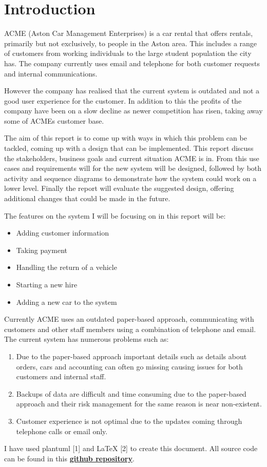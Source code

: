 \section{Introduction}
ACME (Aston Car Management Enterprises) is a car rental that offers rentals, primarily but not exclusively, to people in the Aston area.
This includes a range of customers from working individuals to the large student population the city has. The company currently uses email and telephone
for both customer requests and internal communications. 

However the company has realised that the current system is outdated and not a good user experience for the customer. In addition to this the 
profits of the company have been on a slow decline as newer competition has risen, taking away some of ACMEs customer base. 

The aim of this report is to come up with ways in which this problem can be tackled, coming up with a design that can be implemented. This report
discuss the stakeholders, business goals and current situation ACME is in. From this use cases and requirements will for the new system will be designed,
followed by both activity and sequence diagrams to demonstrate how the system could work on a lower level. Finally the report will evaluate the suggested
design, offering additional changes that could be made in the future.

The features on the system I will be focusing on in this report will be:
\begin{itemize}
  \item Adding customer information
  \item Taking payment
  \item Handling the return of a vehicle
  \item Starting a new hire
  \item Adding a new car to the system
\end{itemize}

Currently ACME uses an outdated paper-based approach, communicating with customers and other staff members using a combination of telephone and email.
The current system has numerous problems such as: 
\begin{enumerate}
  \item Due to the paper-based approach important details such as details about orders, cars and accounting can often go missing causing issues 
  for both customers and internal staff.
  \item Backups of data are difficult and time consuming due to the paper-based approach and their risk management for the same reason is near non-existent.
  \item Customer experience is not optimal due to the updates coming through telephone calls or email only.
\end{enumerate}

\vspace{0.2cm}

I have used plantuml [1] and LaTeX [2] to create this document. All source code can be found in this
\href{https://github.com/OMBowkerBBC/DC4600-Assignment1}{\textbf{github repository}}.

\newpage
